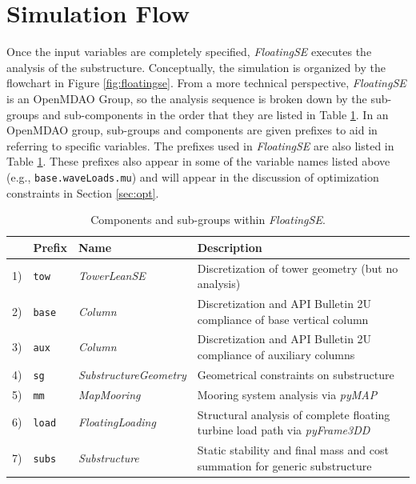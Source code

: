 \section{Simulation Flow}
Once the input variables are completely specified, \textit{FloatingSE}
executes the analysis of the substructure.  Conceptually, the simulation
is organized by the flowchart in Figure \ref{fig:floatingse}.  From a
more technical perspective, \textit{FloatingSE} is an OpenMDAO Group, so
the analysis sequence is broken down by the sub-groups and
sub-components in the order that they are listed in Table
\ref{tbl:exec}.  In an OpenMDAO group, sub-groups and components are
given prefixes to aid in referring to specific variables.  The prefixes
used in \textit{FloatingSE} are also listed in Table \ref{tbl:exec}.
These prefixes also appear in some of the variable names listed above (e.g.,
\texttt{base.waveLoads.mu}) and will appear in the discussion of
optimization constraints in Section \ref{sec:opt}.

\begin{table}[htbp] \begin{center}
    \caption{Components and sub-groups within \textit{FloatingSE}.}
    \label{tbl:exec}
{\small
  \begin{tabular}{ l l l l } \hline
    &  \textbf{Prefix} & \textbf{Name} & \textbf{Description} \\ \hline\hline
    1) & \texttt{tow} & \textit{TowerLeanSE} & Discretization of tower
    geometry (but no analysis) \\
    2) & \texttt{base} & \textit{Column} & Discretization and API
    Bulletin 2U compliance of base vertical column \\
    3) & \texttt{aux} & \textit{Column} & Discretization and API
    Bulletin 2U compliance of auxiliary columns \\
    4) & \texttt{sg} & \textit{SubstructureGeometry} & Geometrical constraints
    on substructure \\
    5) & \texttt{mm} & \textit{MapMooring} & Mooring system analysis via \textit{pyMAP} \\
    6) & \texttt{load} & \textit{FloatingLoading} & Structural analysis
    of complete floating turbine load path via \textit{pyFrame3DD} \\
    7) & \texttt{subs} & \textit{Substructure} & Static stability and final mass and cost summation for generic substructure \\
  \hline \end{tabular}
}
\end{center} \end{table}

